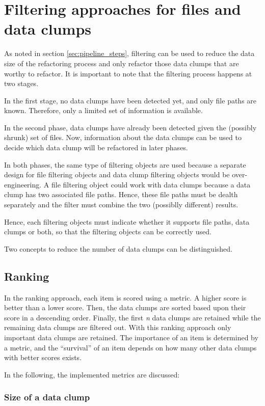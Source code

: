 \section{Filtering approaches for files and data clumps}
\label{sec:data_clump_filtering}

As noted in section \ref{sec:pipeline_steps}, filtering can be used to reduce the data size of the refactoring process and only refactor those data clumps that are worthy to refactor. It is important to note that the filtering process happens at two stages.

In the first stage, no data clumps have been detected yet, and only file paths are known. Therefore, only a limited set of information is available. 

In the second phase, data clumps have already  been detected given the (possibly shrunk) set of files. Now, information about the data clumps can be used  to decide which data clump will be refactored in later phases.

In both phases, the same type of filtering objects are used because  a separate design for file filtering objects and data clump filtering objects would be over-engineering. A file filtering object could work with data clumps because a data clump has two associated file paths. Hence, these file paths must be dealth separately and the filter must combine the two (possiblly different) results.

Hence, each filtering objects must indicate whether it supports file paths, data clumps or both, so that the filtering objects can be correctly used. 


Two concepts to  reduce the number of data clumps can be distinguished.
\subsection{Ranking} \label{sec:metrics}
In the ranking approach, each item is scored using a metric. A higher score is better than a lower score.  Then, the data clumps are sorted based upon their score in a descending order. Finally, the first  \textit{n} data clumps are retained while the remaining data clumps are filtered out. With this ranking approach only important data clumps are retained. The importance of an item is determined by a metric, and the \enquote{survival} of an item depends on how many other data clumps with better scores exists.

In the following, the implemented metrics are discussed:

\subsubsection{Size of a data clump}

